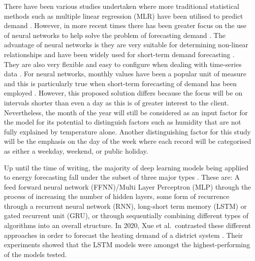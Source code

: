 \documentclass[mstat,12pt]{unswthesis}
\begin{document}
There have been various studies undertaken where more traditional
statistical methods such as multiple linear regression (MLR) have been
utilised to predict demand \cite{Mohamed2005}. However, in more recent
times there has been greater focus on the use of neural networks to help
solve the problem of forecasting demand \cite{Gonzalez2008}. The
advantage of neural networks is they are very suitable for determining
non-linear relationships \cite{Gonzalez2008} and have been widely used
for short-term demand forecasting \cite{Ciulla2019}. They are also very
flexible and easy to configure when dealing with time-series data
\cite{Carmona2002}. For neural networks, monthly values have been a
popular unit of measure and this is particularly true when short-term
forecasting of demand has been employed \cite{Carmona2002}. However,
this proposed solution differs because the focus will be on intervals
shorter than even a day as this is of greater interest to the client.
Nevertheless, the month of the year will still be considered as an input
factor for the model for its potential to distinguish factors such as
humidity that are not fully explained by temperature alone. Another
distinguishing factor for this study will be the emphasis on the day of
the week where each record will be categorised as either a weekday,
weekend, or public holiday.

\bigskip

Up until the time of writing, the majority of deep learning models being
appliied to energy forecasting fall under the subset of three major
types \cite{Kumar2013}. These are: A feed forward neural network
(FFNN)/Multi Layer Perceptron (MLP) through the process of increasing
the number of hidden layers, some form of recurrence through a recurrent
neural network (RNN), long-short term memory (LSTM) or gated recurrent
unit (GRU), or through sequentially combining different types of
algorithms into an overall structure. In 2020, Xue et al.~contrasted
these different approaches in order to forecast the heating demand of a
district system \cite{Xue2020}. Their experiments showed that the LSTM
models were amongst the highest-performing of the models tested.

\bigskip
\end{document}
